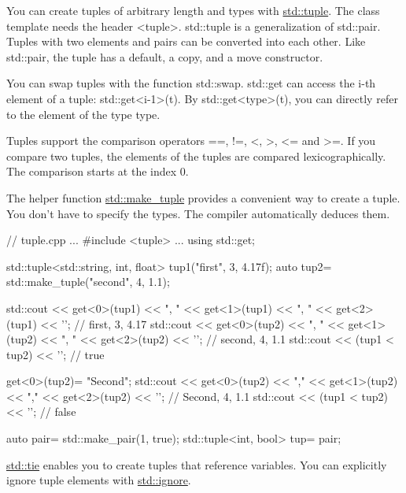 You can create tuples of arbitrary length and types with \href{http://en.cppreference.com/w/cpp/utility/tuple}{std::tuple}. The class template needs the header <tuple>. std::tuple is a generalization of std::pair. Tuples with two elements and pairs can be converted into each other. Like std::pair, the tuple has a default, a copy, and a move constructor.

You can swap tuples with the function std::swap.
std::get can access the i-th element of a tuple: std::get<i-1>(t). By std::get<type>(t), you can directly refer to the element of the type type.

Tuples support the comparison operators ==, !=, <, >, <= and >=. If you compare two tuples, the elements of the tuples are compared lexicographically. The comparison starts at the index 0.


The helper function \href{http://en.cppreference.com/w/cpp/utility/tuple/make_tuple}{std::make\_tuple} provides a convenient way to create a tuple. You don’t have to specify the types. The compiler automatically deduces them.


\begin{cpp}
// tuple.cpp
...
#include <tuple>
...
using std::get;

std::tuple<std::string, int, float> tup1("first", 3, 4.17f);
auto tup2= std::make_tuple("second", 4, 1.1);

std::cout << get<0>(tup1) << ", " << get<1>(tup1) << ", "
		  << get<2>(tup1) << '\n'; // first, 3, 4.17
std::cout << get<0>(tup2) << ", " << get<1>(tup2) << ", "
		  << get<2>(tup2) << '\n'; // second, 4, 1.1
std::cout << (tup1 < tup2) << '\n'; // true

get<0>(tup2)= "Second";
std::cout << get<0>(tup2) << "," << get<1>(tup2) << ","
		  << get<2>(tup2) << '\n'; // Second, 4, 1.1
std::cout << (tup1 < tup2) << '\n'; // false

auto pair= std::make_pair(1, true);
std::tuple<int, bool> tup= pair;
\end{cpp}


\href{http://en.cppreference.com/w/cpp/utility/tuple/tie}{std::tie} enables you to create tuples that reference variables. You can explicitly ignore tuple elements with \href{http://en.cppreference.com/w/cpp/utility/tuple/ignore}{std::ignore}.

